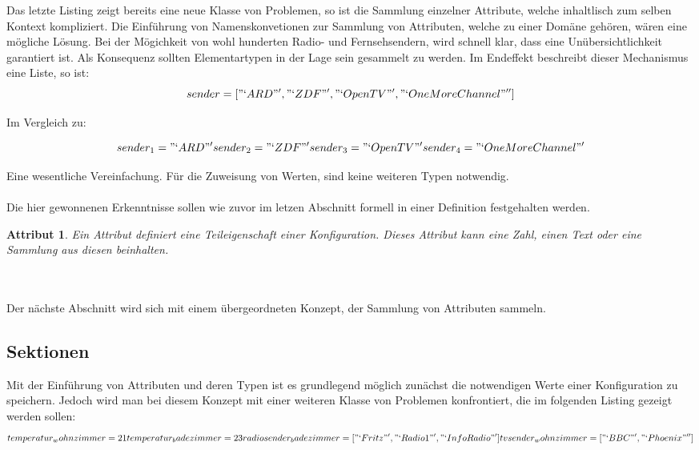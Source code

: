 Das letzte Listing zeigt bereits eine neue Klasse von Problemen, so ist die Sammlung einzelner Attribute, welche inhaltlisch zum selben Kontext kompliziert. Die Einführung von Namenskonvetionen zur Sammlung von Attributen, welche zu einer Domäne gehören, wären eine mögliche Lösung. Bei der Mögichkeit von wohl hunderten Radio- und Fernsehsendern, wird schnell klar, dass eine Unübersichtlichkeit garantiert ist. 	Als Konsequenz sollten Elementartypen in der Lage sein gesammelt zu werden. Im Endeffekt beschreibt dieser Mechanismus eine Liste, so ist:
\begin{equation}
   sender = ["`ARD"', "`ZDF"', "`OpenTV"', "`OneMoreChannel"'']
\end{equation}

Im Vergleich zu: 

\begin{equation}
   	sender_1 = "`ARD"'
	sender_2 = "`ZDF"'
	sender_3 = "`OpenTV"'
	sender_4 = "`OneMoreChannel"'
\end{equation}


Eine wesentliche Vereinfachung. Für die Zuweisung von Werten, sind keine weiteren Typen notwendig. 
\\\\
Die hier gewonnenen Erkenntnisse sollen wie zuvor im letzen Abschnitt formell in einer Definition festgehalten werden.

\newtheorem{mydef}{Attribut}
\begin{mydef}
Ein Attribut definiert eine Teileigenschaft einer Konfiguration. Dieses Attribut kann eine Zahl, einen Text oder eine Sammlung aus diesen beinhalten.
\end{mydef}
\\\\
Der nächste Abschnitt wird sich mit einem übergeordneten Konzept, der Sammlung von Attributen sammeln.


\subsection{Sektionen}
Mit der Einführung von Attributen und deren Typen ist es grundlegend möglich zunächst die notwendigen Werte einer Konfiguration zu speichern. Jedoch wird man bei diesem Konzept mit einer weiteren Klasse von Problemen konfrontiert, die im folgenden Listing gezeigt werden sollen:
\begin{equation}
   	temperatur_wohnzimmer = 21
	temperatur_badezimmer = 23
	radiosender_badezimmer = ["`Fritz"', "`Radio1"', "`InfoRadio"']
	tvsender_wohnzimmer = ["`BBC"', "`Phoenix"'']
\end{equation}

